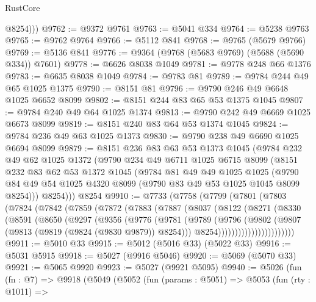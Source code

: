 \begin{lexlean}{RustCore}
\begin{coremodule}
          @8254)))
@9762 := @9372 @9761
@9763 := @5041 @334
@9764 := @5238 @9763
@9765 := @9762 @9764
@9766 := @5112 @841
@9768 := @9765 (@5679 @9766)
@9769 := @5136 @841
@9776 := @9364 (@9768 (@5683 @9769) (@5688 (@5690 @334)) @7601)
@9778 := @6626 @8038 @1049
@9781 := @9778 @248 @66 @1376
@9783 := @6635 @8038 @1049
@9784 := @9783 @81
@9789 := @9784 @244 @49 @65 @1025 @1375
@9790 := @8151 @81
@9796 := @9790 @246 @49 @6648 @1025 @6652 @8099
@9802 := @8151 @244 @83 @65 @53 @1375 @1045
@9807 := @9784 @240 @49 @64 @1025 @1374
@9813 := @9790 @242 @49 @6669 @1025 @6673 @8099
@9819 := @8151 @240 @83 @64 @53 @1374 @1045
@9824 := @9784 @236 @49 @63 @1025 @1373
@9830 := @9790 @238 @49 @6690 @1025 @6694 @8099
@9879 := @8151
    @236
    @83
    @63
    @53
    @1373
    @1045
    (@9784
      @232
      @49
      @62
      @1025
      @1372
      (@9790
        @234
        @49
        @6711
        @1025
        @6715
        @8099
        (@8151
          @232
          @83
          @62
          @53
          @1372
          @1045
          (@9784
            @81
            @49
            @49
            @1025
            @1025
            (@9790 @84 @49 @54 @1025 @4320 @8099 (@9790 @83 @49 @53 @1025 @1045 @8099 @8254)))
          @8254)))
    @8254
@9910 := @7733
    (@7758
      (@7799
        (@7801
          (@7803
            (@7824
              (@7842
                (@7859
                  (@7872
                    (@7883
                      (@7887
                        (@8037
                          (@8122
                            (@8271
                              (@8330
                                (@8591
                                  (@8650
                                    (@9297
                                      (@9356
                                        (@9776
                                          (@9781
                                            (@9789
                                              (@9796
                                                (@9802
                                                  (@9807
                                                    (@9813 (@9819 (@9824 (@9830 @9879)) @8254)))
                                                  @8254)))))))))))))))))))))))
@9911 := @5010 @33
@9915 := @5012 (@5016 @33) (@5022 @33)
@9916 := @5031 @5915
@9918 := @5027 (@9916 @5046)
@9920 := @5069 (@5070 @33)
@9921 := @5065 @9920
@9923 := @5027 (@9921 @5095)
@9940 := @5026
    (fun (fn : @7) =>
    @9918
      (@5049
        (@5052
          (fun (params : @5051) =>
          @5053
            (fun (rty : @1011) =>

\end{coremodule}
\end{lexlean}

